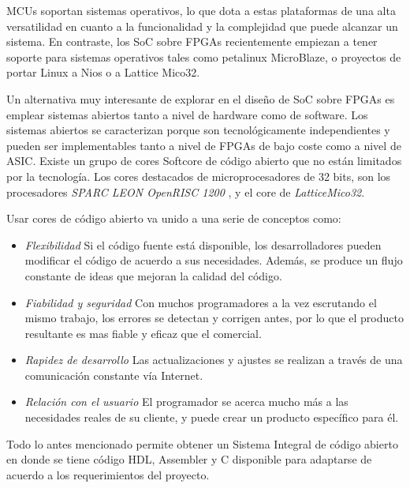 MCUs soportan sistemas operativos, lo que dota a estas plataformas de una alta versatilidad en cuanto a la funcionalidad y la complejidad que puede
alcanzar un sistema. En contraste, los SoC sobre FPGAs recientemente empiezan a tener soporte para sistemas operativos tales como petalinux
MicroBlaze, o proyectos de portar Linux a Nios o a Lattice Mico32.
\vspace{0.5cm}
\par 
Un alternativa muy interesante de explorar en el diseño de SoC sobre FPGAs es emplear sistemas abiertos tanto  a nivel de hardware como de software.
Los sistemas abiertos se caracterizan porque son tecnológicamente independientes y pueden ser implementables tanto a nivel de FPGAs de bajo coste
como a nivel de ASIC. Existe un grupo de cores Softcore de código abierto que no están limitados por la tecnología. Los cores destacados de
microprocesadores de 32 bits, son los procesadores \textit{SPARC LEON OpenRISC 1200} , y el core de \textit{LatticeMico32}. 
\vspace{0.5cm}
\par 
Usar cores de código abierto va unido a una serie de conceptos como:
\begin {itemize}
	\item \textit{Flexibilidad}  Si el código fuente está disponible, los desarrolladores pueden modificar el código de acuerdo a sus necesidades.
	Además, se produce un flujo constante de ideas que mejoran la calidad del código.
	\item \textit{Fiabilidad y seguridad}  Con muchos programadores a la vez escrutando el mismo trabajo, los errores se detectan y corrigen antes, por lo que
	el producto resultante es mas fiable y eficaz que el comercial.
	\item \textit{Rapidez de desarrollo} Las actualizaciones y ajustes se realizan a través de una comunicación constante vía Internet.
	\item \textit{Relación con el usuario} El programador se acerca mucho más a las necesidades reales de su cliente, y puede crear un producto
	específico para él.
 \end {itemize}

\vspace{0.5cm}
\par  
Todo lo antes mencionado permite obtener un Sistema Integral de código abierto en donde se tiene código HDL, Assembler y C disponible para adaptarse
de acuerdo a los requerimientos del proyecto. 

